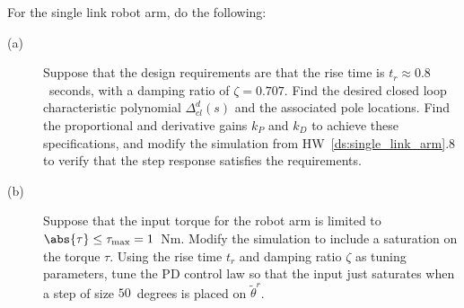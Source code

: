 For the single link robot arm, do the following:
\begin{description}

\item[(a)]  Suppose that the design requirements are that the rise time is
$t_r \approx 0.8$~seconds, with a damping ratio of $\zeta=0.707$.  Find the desired closed loop characteristic polynomial $\Delta_{cl}^d(s)$ and the associated pole locations. Find the proportional and derivative gains $k_P$ and $k_D$ to achieve these specifications, and modify the simulation from HW~\ref{ds:single_link_arm}.8 to verify that the step response satisfies the requirements.

\item[(b)] Suppose that the input torque for the robot arm is limited to $\abs{\tau}\leq\tau_{\max}=1$~Nm.  Modify the simulation to include a saturation on the torque $\tau$.  Using the rise time $t_r$ and damping ratio $\zeta$ as tuning parameters, tune the PD control law  so that the input just saturates when a step of size $50$~degrees is placed on $\tilde{\theta}^r$.

\end{description}